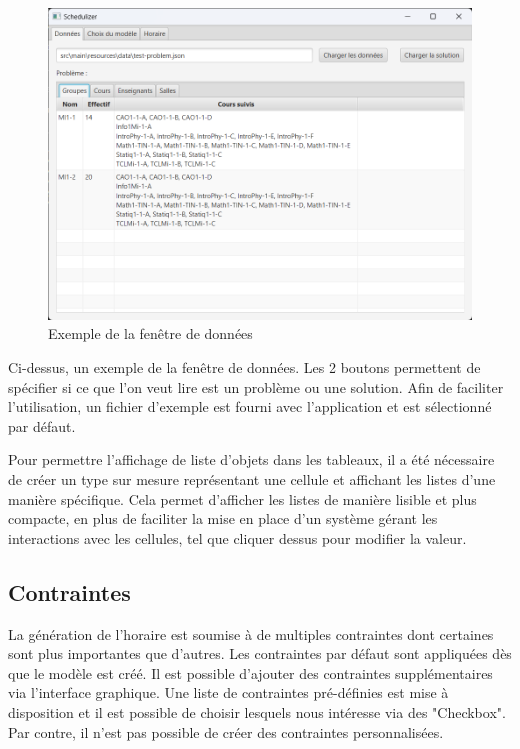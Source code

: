 \begin{figure}[H]
    \centering
    \includegraphics[width=1\textwidth]{./assets/figures/dataWindow.png}
    \caption{Exemple de la fenêtre de données}
\end{figure}

Ci-dessus, un exemple de la fenêtre de données. Les 2 boutons permettent de spécifier si ce que l'on veut lire est un problème ou une solution. Afin de faciliter l'utilisation, un fichier d'exemple est fourni avec l'application et est sélectionné par défaut.

Pour permettre l'affichage de liste d'objets dans les tableaux, il a été nécessaire de créer un type sur mesure représentant une cellule et affichant les listes d'une manière spécifique. Cela permet d'afficher les listes de manière lisible et plus compacte, en plus de faciliter la mise en place d'un système gérant les interactions avec les cellules, tel que cliquer dessus pour modifier la valeur.

\subsection{Contraintes}

La génération de l'horaire est soumise à de multiples contraintes dont certaines sont plus importantes que d'autres. Les contraintes par défaut sont appliquées dès que le modèle est créé. Il est possible d'ajouter des contraintes supplémentaires via l'interface graphique. Une liste de contraintes pré-définies est mise à disposition et il est possible de choisir lesquels nous intéresse via des "Checkbox". Par contre, il n'est pas possible de créer des contraintes personnalisées.

